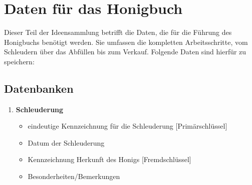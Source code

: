 %
\section{Daten für das Honigbuch}
Dieser Teil der Ideensammlung betrifft die Daten, die für die Führung des Honigbuchs benötigt werden. Sie umfassen die kompletten Arbeitsschritte, vom Schleudern über das Abfüllen bis zum Verkauf. Folgende Daten sind hierfür zu speichern:
\subsection{Datenbanken} 
\begin{enumerate}
\item \textbf{Schleuderung}
\begin{itemize}
\item eindeutige Kennzeichnung für die Schleuderung [Primärschlüssel]
\item Datum der Schleuderung
\item Kennzeichnung Herkunft des Honigs [Fremdschlüssel]
\item Besonderheiten/Bemerkungen
\end{itemize}
\end{enumerate}

%